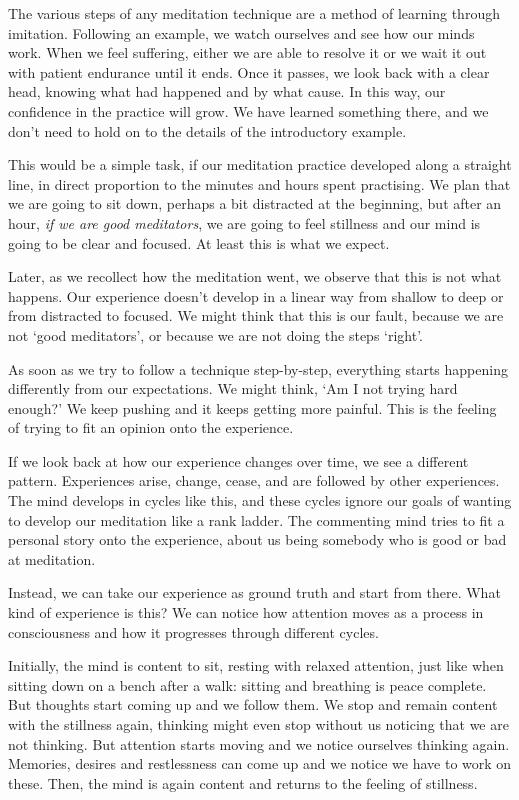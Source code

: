 The various steps of any meditation technique are a method of learning
through imitation. Following an example, we watch ourselves and see how
our minds work. When we feel suffering, either we are able to resolve it
or we wait it out with patient endurance until it ends. Once it passes,
we look back with a clear head, knowing what had happened and by what
cause. In this way, our confidence in the practice will grow. We have
learned something there, and we don't need to hold on to the details of
the introductory example.


This would be a simple task, if our meditation practice developed along
a straight line, in direct proportion to the minutes and hours spent
practising. We plan that we are going to sit down, perhaps a bit
distracted at the beginning, but after an hour, \emph{if we are good
meditators}, we are going to feel stillness and our mind is going to be
clear and focused. At least this is what we expect.

Later, as we recollect how the meditation went, we observe that this is
not what happens. Our experience doesn't develop in a linear way from
shallow to deep or from distracted to focused. We might think that this
is our fault, because we are not `good meditators', or because we are
not doing the steps `right'.

As soon as we try to follow a technique step-by-step, everything starts
happening differently from our expectations. We might think, `Am I not
trying hard enough?' We keep pushing and it keeps getting more painful.
This is the feeling of trying to fit an opinion onto the experience.

If we look back at how our experience changes over time, we see a
different pattern. Experiences arise, change, cease, and are followed by
other experiences. The mind develops in cycles like this, and these
cycles ignore our goals of wanting to develop our meditation like a rank
ladder. The commenting mind tries to fit a personal story onto the
experience, about us being somebody who is good or bad at meditation.

Instead, we can take our experience as ground truth and start from
there. What kind of experience is this? We can notice how attention
moves as a process in consciousness and how it progresses through
different cycles.

Initially, the mind is content to sit, resting with relaxed attention,
just like when sitting down on a bench after a walk: sitting and
breathing is peace complete. But thoughts start coming up and we follow
them. We stop and remain content with the stillness again, thinking
might even stop without us noticing that we are not thinking. But
attention starts moving and we notice ourselves thinking again.
Memories, desires and restlessness can come up and we notice we have to
work on these. Then, the mind is again content and returns to the
feeling of stillness.

